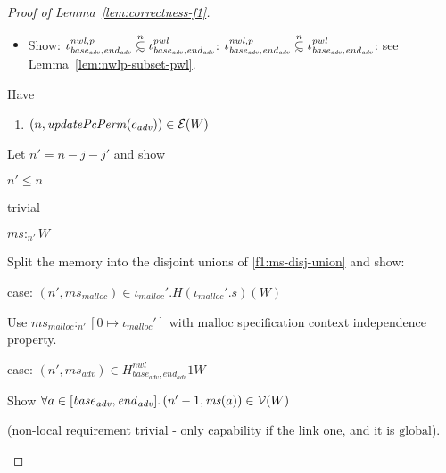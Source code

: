 \documentclass[a4paper]{article}
\newcommand\subsetsim{\mathrel{\ooalign{\raise.2ex\hbox{$\subset$}\cr
      \hidewidth\lower.8ex\hbox{\scalebox{0.9}{$\sim$}}\hidewidth\cr}}}
\newcommand{\nsubsim}[1][n]{\stackrel{\tiny{#1}}{\subsetsim}}
\newcommand{\var}[1]{\mathit{#1}}
\newcommand{\hs}{\var{ms}}
\newcommand{\ms}{\hs}
\newcommand{\start}{\var{base}}
\newcommand{\addrend}{\var{end}}
\newcommand{\heap}{\var{mem}}
\newcommand{\adv}{\var{adv}}
\newcommand{\nwl}{\var{nwl}}
\newcommand{\pwl}{\var{pwl}}
\newcommand{\plainfun}[2]{
  \ifthenelse{\equal{#2}{}}
  {\mathit{#1}}
  {\mathit{#1}(#2)}
}
\newcommand{\updatePcPerm}[1]{\plainfun{updatePcPerm}{#1}}
\newcommand{\heapSat}[3][\heap]{#1 :_{#2} #3}
\newcommand{\codelabel}[1]{\mathit{#1}}
\newcommand{\malloc}{\codelabel{malloc}}
\newcommand{\asmType}{\plaindom{AsmType}}
\newcommand{\plaindom}[1]{\mathrm{#1}}
\newcommand{\intr}[2]{\mathcal{#1}}
\newcommand{\valueintr}[1]{\intr{V}{#1}}
\newcommand{\exprintr}[1]{\intr{E}{#1}}
\newcommand{\stdvr}{\valueintr{\asmType}}
\newcommand{\stder}{\exprintr{\asmType}}
\newcommand{\npair}[2][n]{\left(#1,#2 \right)}
\newcommand{\plainperm}[1]{\mathrm{#1}}
\newcommand{\glob}{\plainperm{global}}
\begin{document}
\begin{proof}[Proof of Lemma~\ref{lem:correctness-f1}]
\begin{itemize}
\begin{itemize}
                  \item Show: $\iota^{\nwl,p}_{\start_\adv,\addrend_\adv} \nsubsim[n] \iota^\pwl_{\start_\adv,\addrend_\adv}$: $\iota^{\nwl,p}_{\start_\adv,\addrend_\adv}
                    \nsubsim[n] \iota^\pwl_{\start_\adv,\addrend_\adv}$: see Lemma~\ref{lem:nwlp-subset-pwl}.
                  \end{itemize}
                \end{itemize}
                Have
                \begin{enumerate}[resume]
                \item $\npair{\updatePcPerm{c_{\var{adv}}}} \in \stder(W)$
                \end{enumerate}
                Let $n' = n - j - j'$ and show
                \begin{enumproof}[resume]
                \item $n' \leq n$
                  \begin{enumproof}
                  \item trivial
                  \end{enumproof}
                \item $\heapSat[\ms]{n'}{W}$
                  \begin{enumproof}
                  \item Split the memory into the disjoint unions of \ref{f1:ms-disj-union} and show:
                    \begin{enumproof}
                    \item case: $\npair[n']{\ms_\malloc} \in \iota_\malloc'.H (\iota_\malloc'.s) (W)$ 
                      \begin{enumproof}
                      \item Use $\heapSat[\ms_\malloc]{n'}{[0 \mapsto \iota_\malloc']}$ with malloc specification context independence property.
                      \end{enumproof}
                    \item case: $\npair[n']{\ms_\adv} \in H^\nwl_{\start_\adv,\addrend_\adv} 1 W$ \label{lem:f1-adv-mem-sat}
                      \begin{enumproof}
                      \item Show $\forall a \in [\start_\adv,\addrend_\adv] \ldotp \npair[n'-1]{\ms(a)} \in \stdvr(W)$
                      \end{enumproof}
                      (non-local requirement trivial - only capability if the link one, and it is $\glob$).

\end{enumproof}
\end{enumproof}
\end{enumproof}
\end{proof}
\end{document}
